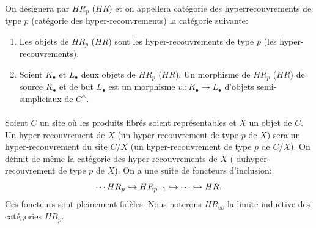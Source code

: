 \documentclass[10pt]{../fichiers-configuration-latex/smfart}
\begin{document}
\paragraph{}
On désignera par $HR_p$ (\resp $HR$) et on appellera catégorie
des hyperrecouvrements de type $p$ (\resp catégorie des
hyper-recouvrements) la catégorie suivante:
\begin{enumerate}
\renewcommand{\theenumi}{\alph {enumi}}
\renewcommand{\labelenumi}{\theenumi)}
\item Les objets de $HR_p$ (\resp $HR$) sont les hyper-recouvrements
  de type $p$ (\resp les hyper-recouvrements).

\item Soient $K_∙$ et $L_∙$ deux objets de $HR_p$ (\resp $HR$). Un
  morphisme de $HR_p$ (\resp $HR$) de source $K_∙$ et de but $L_∙$ est
  un morphisme $v. : K_∙ \to L_∙$ d'objets semi-simpliciaux de
  $C^{\wedge}$.
\end{enumerate}

\paragraph{}
Soient $C$ un site où les produits fibrés soient représentables
et $X$ un objet de $C$. Un hyper-recouvrement de $X$ (\resp un
hyper-recouvrement de type $p$ de $X$) sera un hyper-recouvrement du
site $C/X$ (\resp un hyper-recouvrement de type $p$ de $C/X$). On
définit de même la catégorie des hyper-recouvrements de $X$ (\resp
du\pageoriginale hyper-recouvrement de type $p$ de $X$). On a une
suite de foncteurs d'inclusion:
$$
\cdots HR_p \hookrightarrow HR_{p + 1} \hookrightarrow \cdots
\hookrightarrow HR{}.
$$
Ces foncteurs sont pleinement fidèles. Nous noterons $HR_{\infty}$
la limite inductive des catégories $HR_p$.

\setcounter{paragraph}{5}
\end{document}
